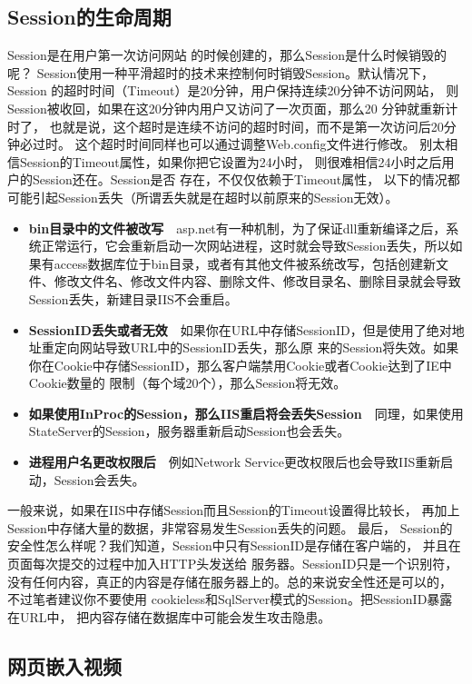\documentclass{book}
\begin{document}
\subsection{Session的生命周期}

Session是在用户第一次访问网站 的时候创建的，那么Session是什么时候销毁的呢？
Session使用一种平滑超时的技术来控制何时销毁Session。默认情况下，
Session 的超时时间（Timeout）是20分钟，用户保持连续20分钟不访问网站，
则Session被收回，如果在这20分钟内用户又访问了一次页面，那么20 分钟就重新计时了，
也就是说，这个超时是连续不访问的超时时间，而不是第一次访问后20分钟必过时。
这个超时时间同样也可以通过调整Web.config文件进行修改。
别太相信Session的Timeout属性，如果你把它设置为24小时，
则很难相信24小时之后用户的Session还在。Session是否 存在，不仅仅依赖于Timeout属性，
以下的情况都可能引起Session丢失（所谓丢失就是在超时以前原来的Session无效）。

\begin{itemize}
\item{\textbf{bin目录中的文件被改写}}~~asp.net有一种机制，为了保证dll重新编译之后，系统正常运行，它会重新启动一次网站进程，这时就会导致Session丢失，所以如果有access数据库位于bin目录，或者有其他文件被系统改写，包括创建新文件、修改文件名、修改文件内容、删除文件、修改目录名、删除目录就会导致Session丢失，新建目录IIS不会重启。
\item{\textbf{SessionID丢失或者无效}}~~如果你在URL中存储SessionID，但是使用了绝对地址重定向网站导致URL中的SessionID丢失，那么原 来的Session将失效。如果你在Cookie中存储SessionID，那么客户端禁用Cookie或者Cookie达到了IE中Cookie数量的 限制（每个域20个），那么Session将无效。
\item{\textbf{如果使用InProc的Session，那么IIS重启将会丢失Session}}~~同理，如果使用StateServer的Session，服务器重新启动Session也会丢失。
\item{\textbf{进程用户名更改权限后}}~~例如Network Service更改权限后也会导致IIS重新启动，Session会丢失。
\end{itemize}

一般来说，如果在IIS中存储Session而且Session的Timeout设置得比较长，
再加上Session中存储大量的数据，非常容易发生Session丢失的问题。
最后， Session的安全性怎么样呢？我们知道，Session中只有SessionID是存储在客户端的，
并且在页面每次提交的过程中加入HTTP头发送给 服务器。SessionID只是一个识别符，
没有任何内容，真正的内容是存储在服务器上的。总的来说安全性还是可以的，
不过笔者建议你不要使用 cookieless和SqlServer模式的Session。把SessionID暴露在URL中，
把内容存储在数据库中可能会发生攻击隐患。

\subsection{网页嵌入视频}
\end{document}
